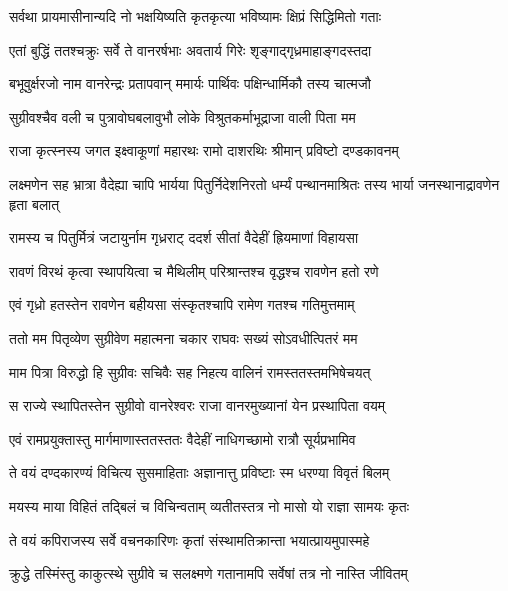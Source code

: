 \twolineshloka
{सर्वथा प्रायमासीनान्यदि नो भक्षयिष्यति}
{कृतकृत्या भविष्यामः क्षिप्रं सिद्धिमितो गताः} %

\twolineshloka
{एतां बुद्धिं ततश्चक्रुः सर्वे ते वानरर्षभाः}
{अवतार्य गिरेः शृङ्गाद्गृध्रमाहाङ्गदस्तदा} %

\twolineshloka
{बभूवुर्क्षरजो नाम वानरेन्द्रः प्रतापवान्}
{ममार्यः पार्थिवः पक्षिन्धार्मिकौ तस्य चात्मजौ} %

\twolineshloka
{सुग्रीवश्चैव वली च पुत्रावोघबलावुभौ}
{लोके विश्रुतकर्माभूद्राजा वाली पिता मम} %

\twolineshloka
{राजा कृत्स्नस्य जगत इक्ष्वाकूणां महारथः}
{रामो दाशरथिः श्रीमान् प्रविष्टो दण्डकावनम्} %

\threelineshloka
{लक्ष्मणेन सह भ्रात्रा वैदेह्या चापि भार्यया}
{पितुर्निदेशनिरतो धर्म्यं पन्थानमाश्रितः}
{तस्य भार्या जनस्थानाद्रावणेन हृता बलात्} %

\twolineshloka
{रामस्य च पितुर्मित्रं जटायुर्नाम गृध्रराट्}
{ददर्श सीतां वैदेहीं ह्रियमाणां विहायसा} %

\twolineshloka
{रावणं विरथं कृत्वा स्थापयित्वा च मैथिलीम्}
{परिश्रान्तश्च वृद्धश्च रावणेन हतो रणे} %

\twolineshloka
{एवं गृध्रो हतस्तेन रावणेन बहीयसा}
{संस्कृतश्चापि रामेण गतश्च गतिमुत्तमाम्} %

\twolineshloka
{ततो मम पितृव्येण सुग्रीवेण महात्मना}
{चकार राघवः सख्यं सोऽवधीत्पितरं मम} %

\twolineshloka
{माम पित्रा विरुद्धो हि सुग्रीवः सचिवैः सह}
{निहत्य वालिनं रामस्ततस्तमभिषेचयत्} %

\twolineshloka
{स राज्ये स्थापितस्तेन सुग्रीवो वानरेश्वरः}
{राजा वानरमुख्यानां येन प्रस्थापिता वयम्} %

\twolineshloka
{एवं रामप्रयुक्तास्तु मार्गमाणास्ततस्ततः}
{वैदेहीं नाधिगच्छामो रात्रौ सूर्यप्रभामिव} %

\twolineshloka
{ते वयं दण्दकारण्यं विचित्य सुसमाहिताः}
{अज्ञानात्तु प्रविष्टाः स्म धरण्या विवृतं बिलम्} %

\twolineshloka
{मयस्य माया विहितं तद्बिलं च विचिन्वताम्}
{व्यतीतस्तत्र नो मासो यो राज्ञा सामयः कृतः} %

\twolineshloka
{ते वयं कपिराजस्य सर्वे वचनकारिणः}
{कृतां संस्थामतिक्रान्ता भयात्प्रायमुपास्महे} %

\twolineshloka
{क्रुद्धे तस्मिंस्तु काकुत्स्थे सुग्रीवे च सलक्ष्मणे}
{गतानामपि सर्वेषां तत्र नो नास्ति जीवितम्} %


